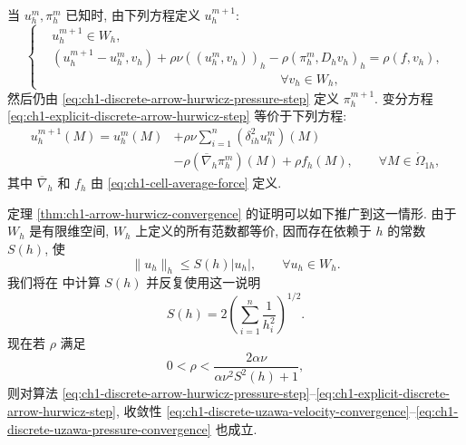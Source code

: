 当 $u_h^m,\pi_h^m$ 已知时, 由下列方程定义 $u_h^{m+1}$:
\begin{equation}
\left\{
\begin{aligned}
&u_h^{m+1}\in W_h,\\
&(u_h^{m+1}-u_h^m,v_h)
+\rho\nu((u_h^m,v_h))_h
-\rho(\pi_h^m,D_hv_h)_h=\rho(f,v_h),\\
&\hspace{18em}\forall v_h\in W_h,
\end{aligned}
\right.
\label{eq:ch1-explicit-discrete-arrow-hurwicz-step}
\end{equation}
然后仍由 \eqref{eq:ch1-discrete-arrow-hurwicz-pressure-step} 定义 $\pi_h^{m+1}$. 变分方程 \eqref{eq:ch1-explicit-discrete-arrow-hurwicz-step} 等价于下列方程:
\begin{equation}
\begin{aligned}
u_h^{m+1}(M)=u_h^m(M)
&+\rho\nu\sum_{i=1}^{n}(\delta_{ih}^2u_h^m)(M)\\
&-\rho(\overline\nabla_h\pi_h^m)(M)
+\rho f_h(M),
\qquad\forall M\in\mathring\Omega_{1h},
\end{aligned}
\label{eq:ch1-explicit-discrete-arrow-hurwicz-pointwise}
\end{equation}
其中 $\overline\nabla_h$ 和 $f_h$ 由 \eqref{eq:ch1-cell-average-force} 定义.

定理 \ref{thm:ch1-arrow-hurwicz-convergence} 的证明可以如下推广到这一情形. 由于 $W_h$ 是有限维空间, $W_h$ 上定义的所有范数都等价, 因而存在依赖于 $h$ 的常数 $S(h)$, 使
\begin{equation}
\lVert u_h\rVert_h\leq S(h)\lvert u_h\rvert,
\qquad\forall u_h\in W_h.
\label{eq:ch1-discrete-norm-equivalence}
\end{equation}
我们将在  中计算 $S(h)$ 并反复使用这一说明
\[
S(h)=2\left(\sum_{i=1}^{n}\frac{1}{h_i^2}\right)^{1/2}.
\]
现在若 $\rho$ 满足
\begin{equation}
0<\rho<\frac{2\alpha\nu}{\alpha\nu^2S^2(h)+1},
\label{eq:ch1-explicit-discrete-arrow-hurwicz-step-condition}
\end{equation}
则对算法 \eqref{eq:ch1-discrete-arrow-hurwicz-pressure-step}--\eqref{eq:ch1-explicit-discrete-arrow-hurwicz-step}, 收敛性 \eqref{eq:ch1-discrete-uzawa-velocity-convergence}--\eqref{eq:ch1-discrete-uzawa-pressure-convergence} 也成立.

